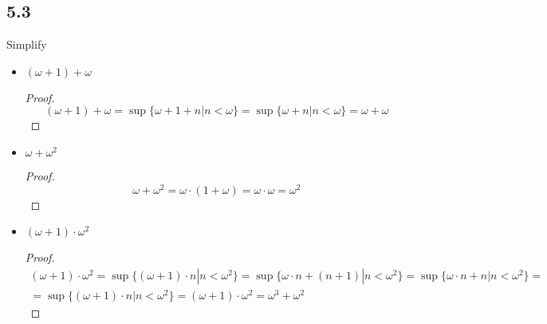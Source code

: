\subsection*{5.3} Simplify

\begin{itemize}
    \item $(\omega + 1) + \omega$
    \begin{proof}
        $$(\omega + 1) + \omega = \sup\{\omega + 1 + n | n < \omega\} = \sup\{\omega + n | n < \omega\} = \omega + \omega$$
    \end{proof}

    \item $\omega + \omega^2$
    
    \begin{proof}
        $$\omega + \omega^2 = \omega \cdot (1+\omega)= \omega \cdot \omega = \omega ^2$$
    \end{proof}

    \item $(\omega + 1) \cdot \omega ^2$

    \begin{proof}
      \begin{align*}
(\omega + 1) \cdot \omega ^2 = \sup\{(\omega + 1) \cdot n | n < \omega^2\} =\sup\{\omega \cdot n + (n+1) | n < \omega^2\} =\sup\{\omega \cdot n + n | n < \omega^2\}=\\ = \sup\{(\omega +1) \cdot n | n < \omega^2\} =
        (\omega+1) \cdot \omega^2 = \omega ^3+\omega^2
      \end{align*} 
    \end{proof}
\end{itemize}


